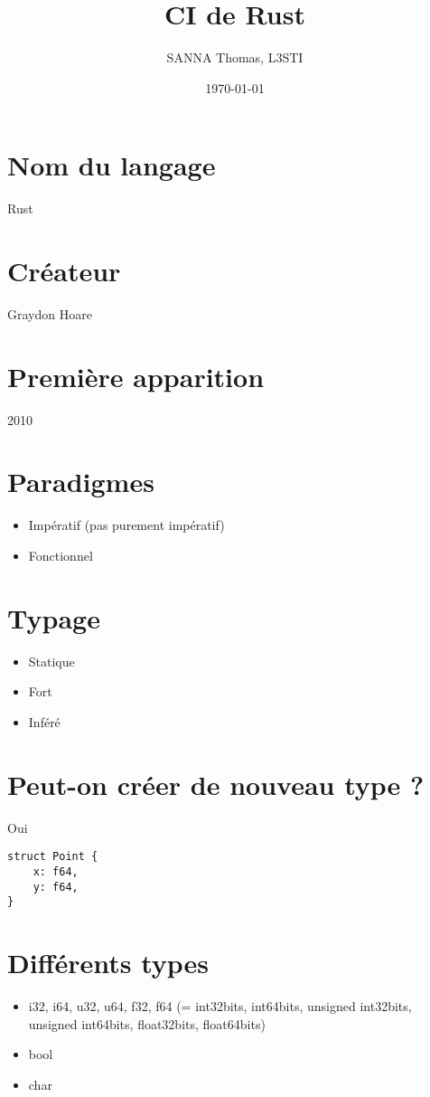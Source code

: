 \documentclass{article}
\title{CI de Rust}
\author{SANNA Thomas, L3STI}
\date{\today}
\begin{document}
\maketitle

\tableofcontents

\newpage

\section{Nom du langage}
Rust

\section{Créateur}
Graydon Hoare

\section{Première apparition}
2010

\section{Paradigmes}
\begin{itemize}
    \item Impératif (pas purement impératif)
    \item Fonctionnel
\end{itemize}

\section{Typage \cite{noauthor_data_nodate}}
\begin{itemize}
    \item Statique
    \item Fort
    \item Inféré
\end{itemize}

\section{Peut-on créer de nouveau type ? \cite{noauthor_data_nodate}}
Oui
\begin{lstlisting}[]
struct Point {
    x: f64,
    y: f64,
}
\end{lstlisting}

\section{Différents types \cite{noauthor_data_nodate}}
\begin{itemize}
    \item i32, i64, u32, u64, f32, f64 (= int32bits, int64bits, unsigned int32bits, unsigned int64bits, float32bits, float64bits)
    \item bool
    \item char
\end{itemize}
\end{document}
